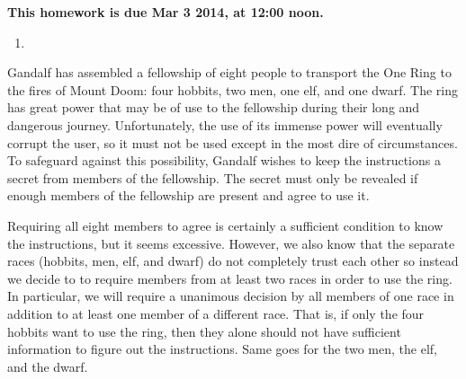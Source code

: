 \documentclass[]{article}
\newif\ifsolutions
\renewcommand{\answer}[1]{{\color{mydarkblue}\textbf{}#1}}
\begin{document}
\maketitle
{}
\vspace{0.5em}
{\Large{\textbf{This homework is due Mar 3 2014, at 12:00 noon.}}}

\begin{qunlist}
  
\begin{enumerate}
\qpart
\item
\ifsolutions{ \answer 
{
}}\fi


\ifsolutions{ \answer {
\textbf{Motivation}
}}\fi
\end{enumerate}

  



Gandalf has assembled a fellowship of eight people to transport the One Ring to the fires of Mount Doom: four hobbits, two men, one elf, and one dwarf. The ring has great power that may be of use to the fellowship during their long and dangerous journey. Unfortunately, the use of its immense power will eventually corrupt the user, so it must not be used except in the most dire of circumstances. To safeguard against this possibility, Gandalf wishes to keep the instructions a secret from members of the fellowship. The secret must only be revealed if enough members of the fellowship are present and agree to use it.

Requiring all eight members to agree is certainly a sufficient condition to know the instructions, but it seems excessive. However, we also know that the separate races (hobbits, men, elf, and dwarf) do not completely trust each other so instead we decide to to require members from at least two races in order to use the ring. In particular, we will require a unanimous decision by all members of one race in addition to at least one member of a different race. That is, if only the four hobbits want to use the ring, then they alone should not have sufficient information to figure out the instructions. Same goes for the two men, the elf, and the dwarf.


\end{qunlist}
\end{document}
